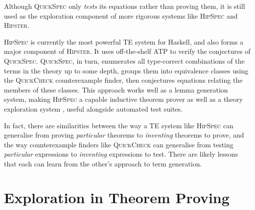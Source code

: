 \documentclass[]{article}
\begin{document}
Although \textsc{QuickSpec} only \emph{tests} its equations rather than proving them, it is still used as the exploration component of more rigorous systems like \textsc{HipSpec} and \textsc{Hipster}.

\textsc{HipSpec} is currently the most powerful TE system for Haskell, and also forms a major component of \textsc{Hipster}. It uses off-the-shelf ATP to verify the conjectures of \textsc{QuickSpec}. \textsc{QuickSpec}, in turn, enumerates all type-correct combinations of the terms in the theory up to some depth, groups them into equivalence classes using the \textsc{QuickCheck} counterexample finder, then conjectures equations relating the members of these classes. This approach works well as a lemma generation system, making \textsc{HipSpec} a capable inductive theorem prover as well as a theory exploration system \cite{claessen2013automating}, useful alongside automated test suites.

In fact, there are similarities between the way a TE system like \textsc{HipSpec} can generalise from proving \emph{particular} theorems to \emph{inventing} theorems to prove, and the way counterexample finders like \textsc{QuickCheck} can generalise from testing \emph{particular} expressions to \emph{inventing} expressions to test. There are likely lessons that each can learn from the other's approach to term generation.





\section{Exploration in Theorem Proving}
\label{examples}
\end{document}
